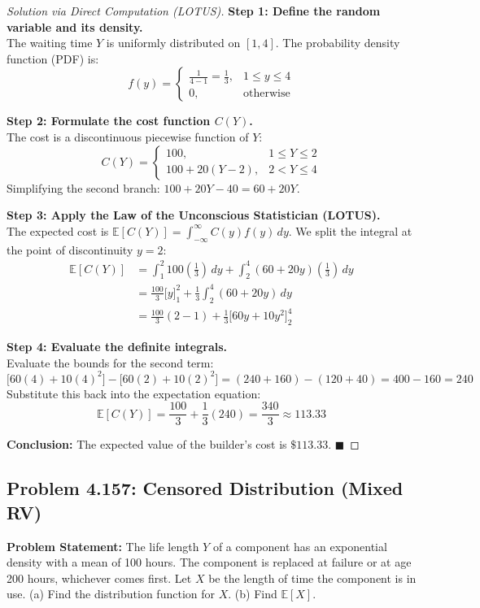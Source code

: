 \documentclass[11pt, a4paper]{article}
\theoremstyle{definition}
\theoremstyle{remark}
\newcommand{\E}{\mathbb{E}}
\begin{document}
\begin{proof}[Solution via Direct Computation (LOTUS)]
\textbf{Step 1: Define the random variable and its density.} \\
The waiting time $Y$ is uniformly distributed on $[1, 4]$. The probability density function (PDF) is:
\[ f(y) = \begin{cases} \frac{1}{4 - 1} = \frac{1}{3}, & 1 \le y \le 4 \\ 0, & \text{otherwise} \end{cases} \]

\textbf{Step 2: Formulate the cost function $C(Y)$.} \\
The cost is a discontinuous piecewise function of $Y$:
\[ C(Y) = \begin{cases} 100, & 1 \le Y \le 2 \\ 100 + 20(Y - 2), & 2 < Y \le 4 \end{cases} \]
Simplifying the second branch: $100 + 20Y - 40 = 60 + 20Y$.

\textbf{Step 3: Apply the Law of the Unconscious Statistician (LOTUS).} \\
The expected cost is $\E[C(Y)] = \int_{-\infty}^{\infty} C(y) f(y) \, dy$. We split the integral at the point of discontinuity $y = 2$:
\begin{align*}
\E[C(Y)] &= \int_{1}^{2} 100 \left(\frac{1}{3}\right) \, dy + \int_{2}^{4} (60 + 20y) \left(\frac{1}{3}\right) \, dy \\
&= \frac{100}{3} \Big[ y \Big]_{1}^{2} + \frac{1}{3} \int_{2}^{4} (60 + 20y) \, dy \\
&= \frac{100}{3}(2 - 1) + \frac{1}{3} \Big[ 60y + 10y^2 \Big]_{2}^{4}
\end{align*}

\textbf{Step 4: Evaluate the definite integrals.} \\
Evaluate the bounds for the second term:
\[ \Big[ 60(4) + 10(4)^2 \Big] - \Big[ 60(2) + 10(2)^2 \Big] = (240 + 160) - (120 + 40) = 400 - 160 = 240 \]
Substitute this back into the expectation equation:
\[ \E[C(Y)] = \frac{100}{3} + \frac{1}{3}(240) = \frac{340}{3} \approx 113.33 \]

\textbf{Conclusion:} The expected value of the builder's cost is $\$113.33$. $\blacksquare$
\end{proof}

\subsection{Problem 4.157: Censored Distribution (Mixed RV)}
\textbf{Problem Statement:} The life length $Y$ of a component has an exponential density with a mean of 100 hours. The component is replaced at failure or at age 200 hours, whichever comes first. Let $X$ be the length of time the component is in use. 
(a) Find the distribution function for $X$. 
(b) Find $\E[X]$.
\end{document}
